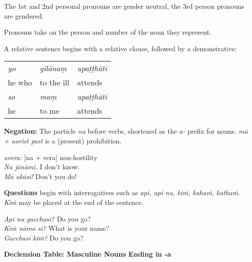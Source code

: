 \documentclass[11pt,oneside]{memoir}
\begin{document}
The 1st and 2nd personal pronouns are gender neutral, the 3rd person pronouns are gendered.

Pronouns take on the person and number of the noun they represent.

\clearpage

A relative sentence begins with a relative clause, followed by a demonstrative:

\begin{center}
\begin{tabular}{lll}
\emph{yo} & \emph{gilānaṃ} & \emph{upaṭṭhāti}\\[0pt]
he who & to the ill & attends\\[0pt]
\emph{so} & \emph{maṃ} & \emph{upaṭṭhāti}\\[0pt]
he & to me & attends\\[0pt]
\end{tabular}
\end{center}

\bigskip

\begin{multicols}{2}

\textbf{Negation:} The particle \emph{na} before verbs, shortened as the \emph{a-} prefix for
nouns. \emph{mā + aorist past} is a (present) prohibition.

\emph{avera:} [na + vera] non-hostility \\[0pt]
\emph{Na jānāmi.} I don't know. \\[0pt]
\emph{Mā akāsi!} Don't you do!

\columnbreak

\textbf{Questions} begin with interrogatives such as \emph{api, api nu, kiṁ, kahaṁ, kathaṁ}.
\emph{Kiṁ} may be placed at the end of the sentence.

\emph{Api nu gacchasi?} Do you go?\\[0pt]
\emph{Kiṁ nāmo si?} What is your name?\\[0pt]
\emph{Gacchasi kiṁ?} Do you go?

\end{multicols}

\textbf{Declension Table: Masculine Nouns Ending in -a}
\end{document}
